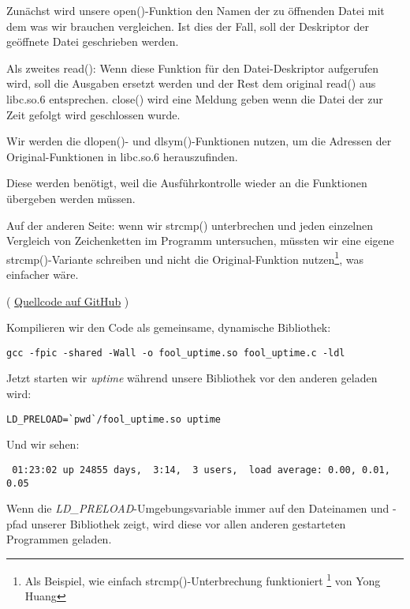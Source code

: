 Zunächst wird unsere open()-Funktion den Namen der zu öffnenden Datei mit dem was
wir brauchen vergleichen. Ist dies der Fall, soll der Deskriptor der geöffnete Datei
geschrieben werden.

Als zweites read(): Wenn diese Funktion für den Datei-Deskriptor aufgerufen wird,
soll die Ausgaben ersetzt werden und der Rest dem original read() aus libc.so.6
entsprechen.
close() wird eine Meldung geben wenn die Datei der zur Zeit gefolgt wird geschlossen
wurde.


Wir werden die dlopen()- und dlsym()-Funktionen nutzen, um die Adressen der Original-Funktionen
in libc.so.6 herauszufinden.

Diese werden benötigt, weil die Ausführkontrolle wieder an die  Funktionen
übergeben werden müssen.


Auf der anderen Seite: wenn wir strcmp() unterbrechen und jeden einzelnen Vergleich
von Zeichenketten im Programm untersuchen, müssten wir eine eigene strcmp()-Variante
schreiben und nicht die Original-Funktion
nutzen\footnote{Als Beispiel, wie einfach strcmp()-Unterbrechung funktioniert
\footnote{\href{http://go.yurichev.com/17143}{yurichev.com}} von Yong Huang}, was
einfacher wäre.


( \href{\GitHubBlobMasterURL/OS/LD_PRELOAD/fool_uptime.c}{Quellcode auf GitHub} )

Kompilieren wir den Code als gemeinsame, dynamische Bibliothek:

\begin{lstlisting}
gcc -fpic -shared -Wall -o fool_uptime.so fool_uptime.c -ldl
\end{lstlisting}

Jetzt starten wir \emph{uptime} während unsere Bibliothek vor den anderen geladen wird:

\begin{lstlisting}
LD_PRELOAD=`pwd`/fool_uptime.so uptime
\end{lstlisting}

Und wir sehen:

\begin{lstlisting}
 01:23:02 up 24855 days,  3:14,  3 users,  load average: 0.00, 0.01, 0.05
\end{lstlisting}

Wenn die \emph{LD\_PRELOAD}-Umgebungsvariable immer auf den Dateinamen und -pfad unserer
Bibliothek zeigt, wird diese vor allen anderen gestarteten Programmen geladen.

